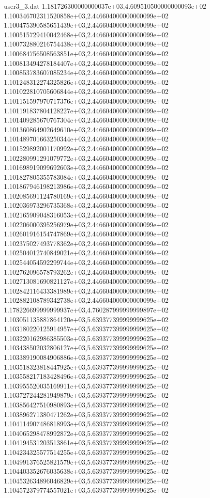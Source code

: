 \begin{filecontents}{user3_3.dat}
1.181726300000000037e+03,4.609510500000000093e+02
1.100346702311520858e+03,2.446604000000000099e+02
1.100475390585651439e+03,2.446604000000000099e+02
1.100515729410042468e+03,2.446604000000000099e+02
1.100732880216754438e+03,2.446604000000000099e+02
1.100684756508563851e+03,2.446604000000000099e+02
1.100813494278184407e+03,2.446604000000000099e+02
1.100853783607085234e+03,2.446604000000000099e+02
1.101248312274325826e+03,2.446604000000000099e+02
1.101022810705606844e+03,2.446604000000000099e+02
1.101151597970717376e+03,2.446604000000000099e+02
1.101191837804128227e+03,2.446604000000000099e+02
1.101409285670767304e+03,2.446604000000000099e+02
1.101360864902649610e+03,2.446604000000000099e+02
1.101489701663250344e+03,2.446604000000000099e+02
1.101529892001170992e+03,2.446604000000000099e+02
1.102280991291079772e+03,2.446604000000000099e+02
1.101698919099692603e+03,2.446604000000000099e+02
1.101827805355783084e+03,2.446604000000000099e+02
1.101867946198213986e+03,2.446604000000000099e+02
1.102085691124780169e+03,2.446604000000000099e+02
1.102036973296735368e+03,2.446604000000000099e+02
1.102165909048316053e+03,2.446604000000000099e+02
1.102206000395256979e+03,2.446604000000000099e+02
1.102601916154747869e+03,2.446604000000000099e+02
1.102375027493778362e+03,2.446604000000000099e+02
1.102504012740849021e+03,2.446604000000000099e+02
1.102544054592299744e+03,2.446604000000000099e+02
1.102762096578793262e+03,2.446604000000000099e+02
1.102713081690821127e+03,2.446604000000000099e+02
1.102842116433381989e+03,2.446604000000000099e+02
1.102882108789342738e+03,2.446604000000000099e+02
1.178226699999999937e+03,4.760287999999999897e+02
1.103051135887864120e+03,5.639377399999999625e+02
1.103180220125914957e+03,5.639377399999999625e+02
1.103220162986385503e+03,5.639377399999999625e+02
1.103438502032806127e+03,5.639377399999999625e+02
1.103389190084906886e+03,5.639377399999999625e+02
1.103518323818447925e+03,5.639377399999999625e+02
1.103558217183428496e+03,5.639377399999999625e+02
1.103955520035169911e+03,5.639377399999999625e+02
1.103727244281949879e+03,5.639377399999999625e+02
1.103856427510980893e+03,5.639377399999999625e+02
1.103896271380471262e+03,5.639377399999999625e+02
1.104114907486818993e+03,5.639377399999999625e+02
1.104065298478992872e+03,5.639377399999999625e+02
1.104194531203513861e+03,5.639377399999999625e+02
1.104234325577514255e+03,5.639377399999999625e+02
1.104991376525821579e+03,5.639377399999999625e+02
1.104403352676035638e+03,5.639377399999999625e+02
1.104532634896046829e+03,5.639377399999999625e+02
1.104572379774557021e+03,5.639377399999999625e+02

\end{filecontents}
